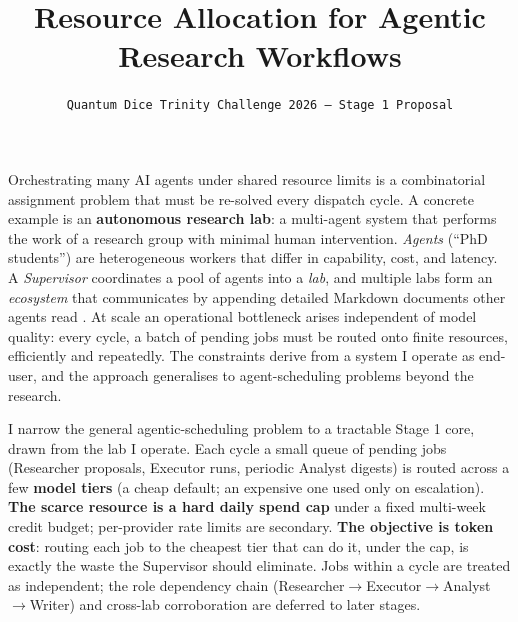 \documentclass{article}
\title{Resource Allocation for Agentic Research Workflows}
\author{\texttt{Quantum Dice Trinity Challenge 2026 --- Stage 1 Proposal}}
\begin{document}
\maketitle

\vspace{-2em}

Orchestrating many AI agents under shared resource limits is a combinatorial assignment problem that must be re-solved every dispatch cycle. A concrete example is an \textbf{autonomous research lab}: a multi-agent system that performs the work of a research group with minimal human intervention. \emph{Agents} (``PhD students'') are heterogeneous workers that differ in capability, cost, and latency. A \emph{Supervisor} coordinates a pool of agents into a \emph{lab}, and multiple labs form an \emph{ecosystem} that communicates by appending detailed Markdown documents other agents read \citep{wang2024survey}. At scale an operational bottleneck arises independent of model quality: every cycle, a batch of pending jobs must be routed onto finite resources, efficiently and repeatedly. The constraints derive from a system I operate as end-user, and the approach generalises to agent-scheduling problems beyond the research.

I narrow the general agentic-scheduling problem \citep{pinedo2016scheduling} to a tractable Stage 1 core, drawn from the lab I operate. Each cycle a small queue of pending jobs (Researcher proposals, Executor runs, periodic Analyst digests) is routed across a few \textbf{model tiers} (a cheap default; an expensive one used only on escalation). \textbf{The scarce resource is a hard daily spend cap} under a fixed multi-week credit budget; per-provider rate limits are secondary. \textbf{The objective is token cost}: routing each job to the cheapest tier that can do it, under the cap, is exactly the waste the Supervisor should eliminate. Jobs within a cycle are treated as independent; the role dependency chain (Researcher$\to$Executor$\to$Analyst$\to$Writer) and cross-lab corroboration are deferred to later stages.
\end{document}
